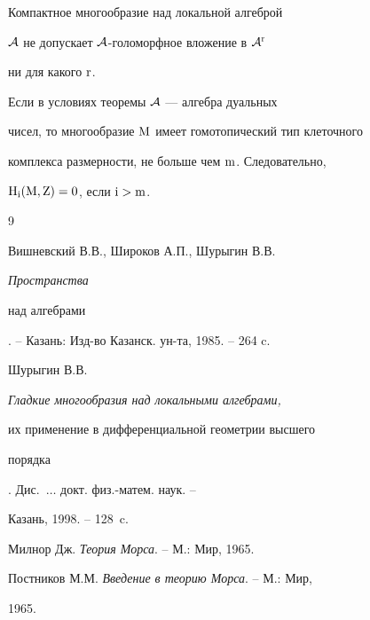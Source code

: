  


\begin{cor} 


Компактное многообразие над локальной алгеброй 


$\cal A$ не допускает $\cal A$-го\-ло\-морф\-ное вложение в $\cal A^{\mathrm r}$


ни для какого $\mathrm r$. 


\end{cor} 


 


\begin{cor} 


Если в условиях теоремы $\cal A$ --- алгебра дуальных 


чисел, то многообразие $\mathrm M$ имеет гомотопический тип клеточного 


комплекса размерности, не больше чем $\mathrm m$. Следовательно, 


$\mathrm H_{\mathrm i}(\mathrm M,\mathrm Z)=0$, если $\mathrm i>\mathrm m$. 


\end{cor} 


 


 


\begin{thebibliography}{9} 


 




Вишневский В.В., Широков А.П., Шурыгин В.В. {\em Пространства 


над алгебрами}. -- Казань: Изд-во Казанск. ун-та, 1985. -- 264 c.




Шурыгин В.В. {\em Гладкие многообразия над локальными алгебрами, 


их применение в дифференциальной геометрии высшего 


порядка}. Дис.~$\dotsc$ докт. физ.-матем. наук. -- 


Казань, 1998. -- 128~c.




Милнор Дж. {\em Теория Морса}. -- М.: Мир, 1965.




Постников М.М. {\em Введение в теорию Морса}. -- М.: Мир, 


1965.


 


\end{thebibliography} 


 


\vskip 2cm 


 






 


\label{end} 


 


 


